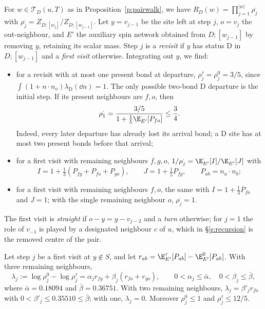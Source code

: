 For $w\in\mathcal T_D(u,T)$ as in Proposition~\ref{p:pairwalk}, we have
$R^\cdot_D(w)=\prod_{j=1}^{|w|}\rho^\cdot_j$ with
$\rho^\cdot_j=Z^\cdot_{D;[w_j]}/Z^\cdot_{D;[w_{j-1}]}$.
Let $y=v_{j-1}$ be the site left at step $j$, $o=v_j$ the
out-neighbour, and $E'$ the auxiliary spin network obtained from
$D;[w_{j-1}]$ by removing $y$, retaining its scalar mass. Step $j$ is
a \emph{revisit} if $y$ has status $\mathrm D$ in $D;[w_{j-1}]$ and
a \emph{first visit} otherwise. Integrating out $y$, we find:
\begin{itemize}
\item for a revisit with at most one present bond at departure,
$\rho^\tau_j=\rho^0_j=3/5$, since
$\int(1+n\cdot n_o)\lambda_{\mathrm D}(\dd n)=1$.
The only possible two-bond $\mathrm D$ departure is the initial step.
If its present neighbours are $f,o$, then
\[
\rho^\cdot_1=
\frac{3/5}{1+\frac15\E^\cdot_{E'}[P_{fo}]}\le\frac34.
\]
Indeed, every later departure has already lost its arrival bond;
a $\mathrm D$ site has at most two present bonds before that arrival;
\item for a first visit with remaining neighbours $f, g, o$, $1/\rho^\cdot_j = \E^\cdot_{E'}[I] / \E^\cdot_{E'}[J]$ with
\begin{equation}\label{e:IJ}
I = 1 + \tfrac13 (P_{fg} + P_{fo} + P_{go}), \qquad J = 1 + \tfrac15 P_{fg}, \qquad P_{ab} = n_a \cdot n_b ;
\end{equation}
\item for a first visit with remaining neighbours $f, o$, the same with $I = 1 + \frac13 P_{fo}$ and $J = 1$; with the single remaining neighbour $o$, $\rho^\cdot_j = 1$.
\end{itemize}
The first visit is \emph{straight} if $o - y = y - v_{j - 2}$ and a \emph{turn} otherwise; for $j = 1$ the role of $v_{-1}$ is played by a designated neighbour $c$ of $u$, which in \S\ref{s:recursion} is the removed centre of the pair.

\begin{lemma}\label{l:response}
Let step $j$ be a first visit at $y \notin S$, and let $r_{ab} = \E^\tau_{E'}[P_{ab}] - \E^0_{E'}[P_{ab}]$. With three remaining neighbours,
\begin{equation}\label{e:lambda}
\lambda_j := \log \rho^0_j - \log \rho^\tau_j = \alpha_j r_{fg} + \beta_j (r_{fo} + r_{go}), \qquad 0 < \alpha_j \le \bar\alpha, \quad 0 < \beta_j \le \bar\beta,
\end{equation}
where $\bar \alpha = 0.18094$ and $\bar \beta = 0.36751$. With two remaining neighbours, $\lambda_j = \beta'_j r_{fo}$ with $0 < \beta'_j \le 0.35510 \le \bar\beta$; with one, $\lambda_j = 0$. Moreover $\rho^0_j \le 1$ and $\rho^\tau_j \le 12/5$.
\end{lemma}

